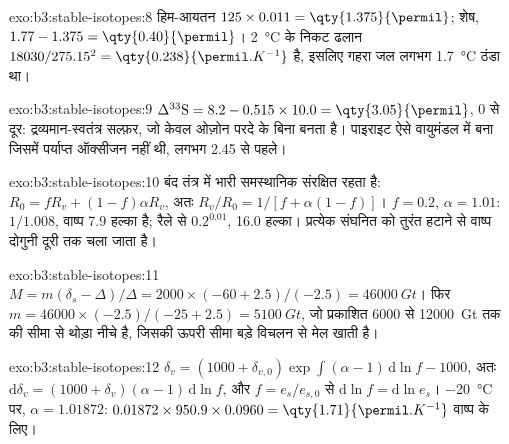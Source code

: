 \begin{solution}{exo:b3:stable-isotopes:8}
हिम-आयतन $125\times0.011 = \qty{1.375}{\permil}$; शेष, $1.77 - 1.375 =
\qty{0.40}{\permil}$। \qty{2}{\celsius} के निकट ढलान $18030/275.15^2 =
\qty{0.238}{\permil.K^{-1}}$ है, इसलिए गहरा जल लगभग \qty{1.7}{\celsius}
ठंडा था।
\end{solution}

\begin{solution}{exo:b3:stable-isotopes:9}
$\Delta^{33}\mathrm S = 8.2 - 0.515\times10.0 = \qty{3.05}{\permil}$, 0 से दूर:
द्रव्यमान-स्वतंत्र सल्फ़र, जो केवल ओज़ोन परदे के बिना बनता है। पाइराइट
ऐसे वायुमंडल में बना जिसमें पर्याप्त ऑक्सीजन नहीं थी, लगभग
\qty{2.45}{\Ga} से पहले।
\end{solution}

\begin{solution}{exo:b3:stable-isotopes:10}
बंद तंत्र में भारी समस्थानिक संरक्षित रहता है: $R_0 = fR_v + (1 -
f)\alpha R_v$, अतः $R_v/R_0 = 1/[f + \alpha(1 - f)]$। $f = 0.2$, $\alpha =
1.01$: $1/1.008$, वाष्प \qty{7.9}{\permil} हल्का है; रैले से
$0.2^{0.01}$, \qty{16.0}{\permil} हल्का। प्रत्येक संघनित को तुरंत हटाने से
वाष्प दोगुनी दूरी तक चला जाता है।
\end{solution}

\begin{solution}{exo:b3:stable-isotopes:11}
$M = m(\delta_s - \Delta)/\Delta = 2000\times(-60 + 2.5)/(-2.5) = \qty{46000}{Gt}$।
फिर $m = 46000\times(-2.5)/(-25 + 2.5) = \qty{5100}{Gt}$, जो प्रकाशित
6000 से \qty{12000}{Gt} तक की सीमा से थोड़ा नीचे है, जिसकी ऊपरी सीमा बड़े
विचलन से मेल खाती है।
\end{solution}

\begin{solution}{exo:b3:stable-isotopes:12}
$\delta_v = (1000 + \delta_{v,0})\exp\int(\alpha - 1)\,\mathrm d\ln f - 1000$, अतः
$\mathrm d\delta_v = (1000 + \delta_v)(\alpha - 1)\,\mathrm d\ln f$, और $f =
e_s/e_{s,0}$ से $\mathrm d\ln f = \mathrm d\ln e_s$। \qty{-20}{\celsius} पर,
$\alpha = 1.01872$: $0.01872\times950.9\times0.0960 =
\qty{1.71}{\permil.K^{-1}}$ वाष्प के लिए।
\end{solution}

